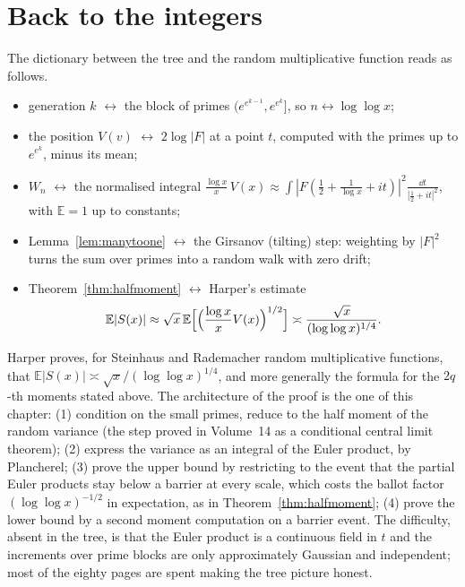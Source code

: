 \section{Back to the integers}

The dictionary between the tree and the random multiplicative function reads as follows.
\begin{itemize}
\item generation $k$ $\leftrightarrow$ the block of primes $(e^{e^{k-1}},e^{e^k}]$, so $n\leftrightarrow\log\log x$;
\item the position $V(v)$ $\leftrightarrow$ $2\log|F|$ at a point $t$, computed with the primes up to $e^{e^k}$, minus its mean;
\item $W_n$ $\leftrightarrow$ the normalised integral $\frac{\log x}x\,V(x)\approx\int|F(\frac12+\frac1{\log x}+it)|^2\frac{\dd t}{|\frac12+it|^2}$, with $\mathbb E=1$ up to constants;
\item Lemma~\ref{lem:manytoone} $\leftrightarrow$ the Girsanov (tilting) step: weighting by $|F|^2$ turns the sum over primes into a random walk with zero drift;
\item Theorem~\ref{thm:halfmoment} $\leftrightarrow$ Harper's estimate
\[
\mathbb E|S(x)|\approx\sqrt x\,\mathbb E\Bigl[\Bigl(\frac{\log x}xV(x)\Bigr)^{1/2}\Bigr]\asymp\frac{\sqrt x}{(\log\log x)^{1/4}}.
\]
\end{itemize}

\begin{remark}\label{rem:harper2020}
Harper proves, for Steinhaus and Rademacher random multiplicative functions, that $\mathbb E|S(x)|\asymp\sqrt x/(\log\log x)^{1/4}$, and more generally the formula for the $2q$-th moments stated above. The architecture of the proof is the one of this chapter: (1) condition on the small primes, reduce to the half moment of the random variance (the step proved in Volume~14 as a conditional central limit theorem); (2) express the variance as an integral of the Euler product, by Plancherel; (3) prove the upper bound by restricting to the event that the partial Euler products stay below a barrier at every scale, which costs the ballot factor $(\log\log x)^{-1/2}$ in expectation, as in Theorem~\ref{thm:halfmoment}; (4) prove the lower bound by a second moment computation on a barrier event. The difficulty, absent in the tree, is that the Euler product is a continuous field in $t$ and the increments over prime blocks are only approximately Gaussian and independent; most of the eighty pages are spent making the tree picture honest.
\end{remark}

